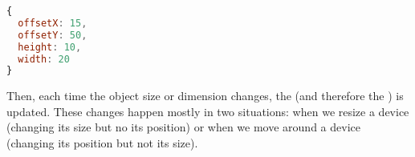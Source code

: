 \begin{lstlisting}[language=JavaScript,label=cookiehash,caption=Cookie Hash example] % JavaScript
{
  offsetX: 15,
  offsetY: 50,
  height: 10,
  width: 20
}
\end{lstlisting}

Then, each time the object size or dimension changes, the  (and therefore the ) is updated.
These changes happen mostly in two situations: when we resize a device (changing its size but no its position) or when we move around a device (changing its position but not its size).


